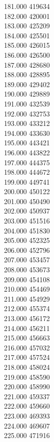 { 181.000	419634 \\
 182.000	420001 \\
 183.000	425209 \\
 184.000	425501 \\
 185.000	426015 \\
 186.000	426500 \\
 187.000	428680 \\
 188.000	428895 \\
 189.000	429402 \\
 190.000	429889 \\
 191.000	432539 \\
 192.000	432753 \\
 193.000	433212 \\
 194.000	433630 \\
 195.000	443421 \\
 196.000	443822 \\
 197.000	444375 \\
 198.000	444672 \\
 199.000	449741 \\
 200.000	450122 \\
 201.000	450490 \\
 202.000	450937 \\
 203.000	451516 \\
 204.000	451830 \\
 205.000	452325 \\
 206.000	452796 \\
 207.000	453457 \\
 208.000	453673 \\
 209.000	454108 \\
 210.000	454469 \\
 211.000	454929 \\
 212.000	455374 \\
 213.000	456172 \\
 214.000	456211 \\
 215.000	456663 \\
 216.000	457032 \\
 217.000	457524 \\
 218.000	458024 \\
 219.000	458590 \\
 220.000	458990 \\
 221.000	459337 \\
 222.000	459660 \\
 223.000	469393 \\
 224.000	469607 \\
 225.000	471916 \\
}
